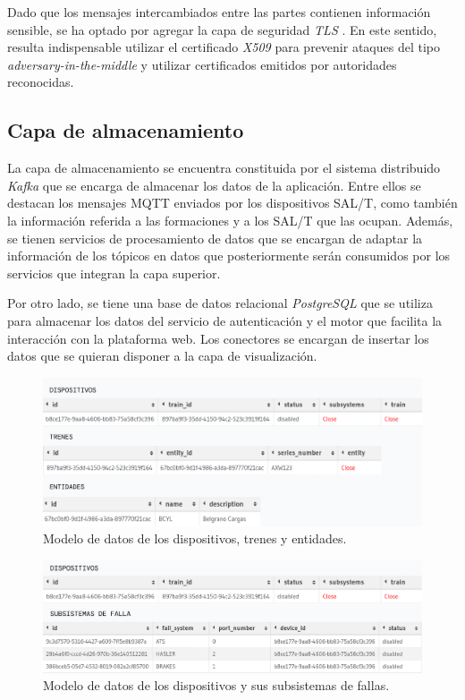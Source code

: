 Dado que los mensajes intercambiados entre las partes contienen información sensible, se ha optado por agregar la capa de seguridad \textit{TLS} \cite{b10}. En este sentido, resulta indispensable utilizar el certificado \textit{X509} \cite{b11} para prevenir ataques del tipo \textit{adversary-in-the-middle} \cite{b12} y utilizar certificados emitidos por autoridades reconocidas.


\subsection{Capa de almacenamiento}

La capa de almacenamiento se encuentra constituida por el sistema distribuido \textit{Kafka} que se encarga de almacenar los datos de la aplicación. Entre ellos se destacan los mensajes MQTT enviados por los dispositivos SAL/T, como también la información referida a las formaciones y a los SAL/T que las ocupan. Además, se tienen servicios de procesamiento de datos que se encargan de adaptar la información de los tópicos en datos que posteriormente serán consumidos por los servicios que integran la capa superior.

Por otro lado, se tiene una base de datos relacional \textit{PostgreSQL} \cite{b13} que se utiliza para almacenar los datos del servicio de autenticación y el motor que facilita la interacción con la plataforma web. Los conectores se encargan de insertar los datos que se quieran disponer a la capa de visualización.

\begin{figure}[ht]
\centering 
\includegraphics[width=.5\textwidth]{images/v2.1.0/device_train_entity.jpg}
\caption{Modelo de datos de los dispositivos, trenes y entidades.}
\label{fig:devicesTrainEntity}
\end{figure}

\begin{figure}[ht]
\centering 
\includegraphics[width=.5\textwidth]{images/v2.1.0/device_fail_system.jpg}
\caption{Modelo de datos de los dispositivos y sus subsistemas de fallas.}
\label{fig:devicesSubsystems}
\end{figure}

